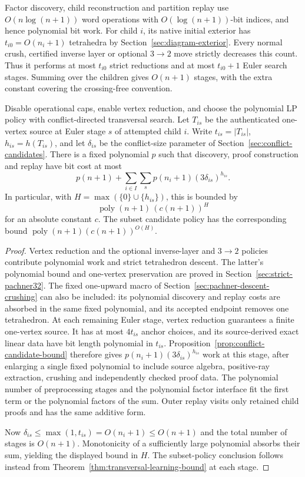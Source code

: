 Factor discovery, child reconstruction and partition replay use
$O(n\log(n+1))$ word operations with $O(\log(n+1))$-bit indices, and hence
polynomial bit work.  For child $i$, its native initial exterior has
$t_{i0}=O(n_i+1)$ tetrahedra by Section~\ref{sec:diagram-exterior}.
Every normal crush, certified inverse layer or optional $3\to2$ move
strictly decreases this count.  Thus it performs at most $t_{i0}$ strict reductions and at most
$t_{i0}+1$ Euler search stages.  Summing over the children gives $O(n+1)$
stages, with the extra constant covering the crossing-free convention.

\begin{proposition}
\label{prop:factored-crushing-cost}
Disable operational caps, enable vertex reduction, and choose the
polynomial LP policy with conflict-directed transversal search.  Let
$T_{is}$ be the authenticated one-vertex source at Euler stage $s$ of
attempted child $i$.  Write $t_{is}=|T_{is}|$, $h_{is}=h(T_{is})$, and
let $\delta_{is}$ be the conflict-size parameter of
Section~\ref{sec:conflict-candidates}.  There is a fixed polynomial $p$
such that discovery, proof construction and replay have bit cost at most
\[
 p(n+1)+\sum_{i\in I}\sum_s
       p(n_i+1)(3\delta_{is})^{h_{is}}.
\]
In particular, with $H=\max(\{0\}\cup\{h_{is}\})$, this is bounded by
\[
 \operatorname{poly}(n+1)\,(c(n+1))^H
\]
for an absolute constant $c$.  The subset candidate policy has the
corresponding bound
$\operatorname{poly}(n+1)(c(n+1))^{O(H)}$.
\end{proposition}
\begin{proof}
Vertex reduction and the optional inverse-layer and $3\to2$ policies
contribute polynomial work and strict tetrahedron descent.  The latter's
polynomial bound and one-vertex preservation are proved in
Section~\ref{sec:strict-pachner32}.  The fixed one-upward macro of Section~\ref{sec:pachner-descent-crushing}
can also be included: its polynomial discovery and replay costs are absorbed
in the same fixed polynomial, and its accepted endpoint removes one tetrahedron.
At each remaining Euler stage,
vertex reduction guarantees a finite one-vertex source.  It has at most
$4t_{is}$ anchor choices, and its source-derived exact linear data have
bit length polynomial in $t_{is}$.  Proposition~\ref{prop:conflict-candidate-bound}
therefore gives
$p(n_i+1)(3\delta_{is})^{h_{is}}$ work at this stage, after enlarging a
single fixed polynomial to include source algebra, positive-ray extraction,
crushing and independently checked proof data.  The polynomial number of
preprocessing stages and the polynomial factor interface fit the first term
or the polynomial factors of the sum.  Outer replay visits only retained
child proofs and has the same additive form.

Now $\delta_{is}\le\max(1,t_{is})=O(n_i+1)\le O(n+1)$ and the total
number of stages is $O(n+1)$.  Monotonicity of a sufficiently large
polynomial absorbs their sum, yielding the displayed bound in $H$.
The subset-policy conclusion follows instead from
Theorem~\ref{thm:transversal-learning-bound} at each stage.
\end{proof}

